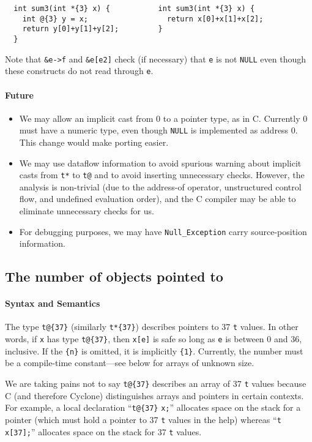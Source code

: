 \begin{verbatim}
  int sum3(int *{3} x) {           int sum3(int *{3} x) {
    int @{3} y = x;                  return x[0]+x[1]+x[2];
    return y[0]+y[1]+y[2];         }
  }
\end{verbatim}


Note that \texttt{\&e->f} and \texttt{\&e[e2]} check (if necessary) that
\texttt{e} is not \texttt{NULL} even though these constructs do not read
through \texttt{e}.

\paragraph{Future}

\begin{itemize}
\item We may allow an implicit cast from 0 to a pointer type, as in
  C\@.  Currently 0 must have a numeric type, even though \texttt{NULL}
  is implemented as address 0.  This change would make porting easier.
\item We may use dataflow information to avoid spurious warning about
  implicit casts from \texttt{t*} to \texttt{t@} and to avoid
  inserting unnecessary checks.  However, the analysis is
  non-trivial (due to the address-of operator, unstructured control
  flow, and undefined evaluation order), and the C compiler may be
  able to eliminate unnecessary checks for us.
\item For debugging purposes, we may have \texttt{Null_Exception}
  carry source-position information.
\end{itemize}

\subsection*{\hypertarget{pointer_bound}{The number of objects pointed to}}

\paragraph{Syntax and Semantics}
The type \verb|t@{37}| (similarly \verb|t*{37}|) describes pointers to
37 \texttt{t} values.  In other words, if \texttt{x} has type
\verb|t@{37}|, then \texttt{x[e]} is safe so long as \texttt{e} is between
0 and 36, inclusive.  If the \verb|{n}| is omitted, it is implicitly
\verb|{1}|.  Currently, the number must be a compile-time
constant---see below for arrays of unknown size.

We are taking pains not to say \verb|t@{37}| describes an array of 37
\texttt{t} values because C (and therefore Cyclone) distinguishes arrays
and pointers in certain contexts.  For example, a local declaration
``\verb|t@{37}| \texttt{x;}'' allocates space on the stack for a pointer
(which must hold a pointer to 37 \texttt{t} values in the help) whereas
``\texttt{t x[37];}'' allocates space on the stack for 37 \texttt{t}
values.


